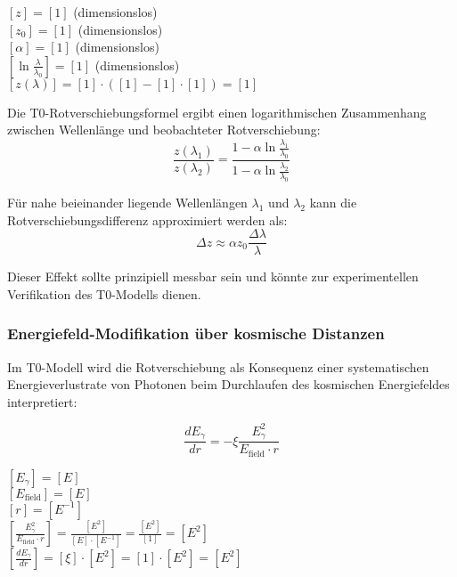 \documentclass[12pt,a4paper]{article}
\theoremstyle{definition}
\begin{document}
\begin{einheitencheck}
	$[z] = [1]$ (dimensionslos)\\
	$[z_0] = [1]$ (dimensionslos)\\
	$[\alpha] = [1]$ (dimensionslos)\\
	$[\ln\frac{\lambda}{\lambda_0}] = [1]$ (dimensionslos)\\
	$[z(\lambda)] = [1] \cdot ([1] - [1] \cdot [1]) = [1]$ \checkmark
\end{einheitencheck}

\begin{verhaltnis}
	Die T0-Rotverschiebungsformel ergibt einen logarithmischen Zusammenhang zwischen Wellenlänge und beobachteter Rotverschiebung:
	\begin{equation}
		\frac{z(\lambda_1)}{z(\lambda_2)} = \frac{1 - \alpha \ln\frac{\lambda_1}{\lambda_0}}{1 - \alpha \ln\frac{\lambda_2}{\lambda_0}}
	\end{equation}
	
	Für nahe beieinander liegende Wellenlängen $\lambda_1$ und $\lambda_2$ kann die Rotverschiebungsdifferenz approximiert werden als:
	\begin{equation}
		\Delta z \approx \alpha z_0 \frac{\Delta\lambda}{\lambda}
	\end{equation}
	
	Dieser Effekt sollte prinzipiell messbar sein und könnte zur experimentellen Verifikation des T0-Modells dienen.
\end{verhaltnis}

\subsubsection{Energiefeld-Modifikation über kosmische Distanzen}

Im T0-Modell wird die Rotverschiebung als Konsequenz einer systematischen Energieverlustrate von Photonen beim Durchlaufen des kosmischen Energiefeldes interpretiert:

\begin{equation}
	\boxed{\frac{dE_\gamma}{dr} = -\xi \frac{E_\gamma^2}{E_{\text{field}} \cdot r}}
\end{equation}

\begin{einheitencheck}
	$[E_\gamma] = [E]$\\
	$[E_{\text{field}}] = [E]$\\
	$[r] = [E^{-1}]$\\
	$[\frac{E_\gamma^2}{E_{\text{field}} \cdot r}] = \frac{[E^2]}{[E] \cdot [E^{-1}]} = \frac{[E^2]}{[1]} = [E^2]$\\
	$[\frac{dE_\gamma}{dr}] = [\xi] \cdot [E^2] = [1] \cdot [E^2] = [E^2]$ \checkmark
\end{einheitencheck}
\end{document}
